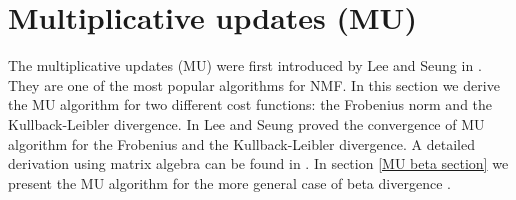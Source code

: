\section{Multiplicative updates (MU)} \label{MU derivation section}
The multiplicative updates (MU) were first introduced by Lee and Seung in \cite{Lee1999}. They are one of the most popular algorithms for NMF.
In this section we derive the MU algorithm for two different cost functions: the Frobenius norm and the Kullback-Leibler divergence.
In \cite{lee2000algorithms} Lee and Seung proved the convergence of MU algorithm for the Frobenius and the Kullback-Leibler divergence.
A detailed derivation using matrix algebra can be found in \cite{burred2014detailed}.
In section \ref{MU beta section} we present the MU algorithm for the more general case of beta divergence \cite{févotte2011algorithmsnonnegativematrixfactorization}.
